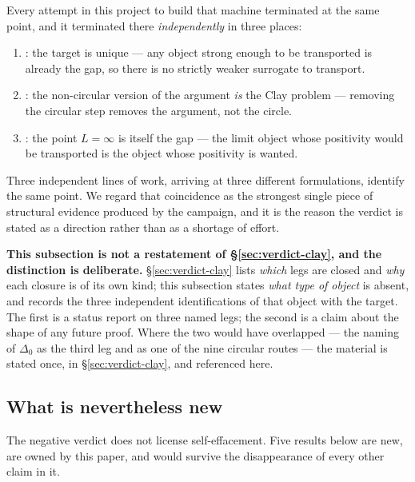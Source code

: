 Every attempt in this project to build that machine terminated at the same point, and it terminated
there \emph{independently} in three places:

\begin{enumerate}
\item {}: the target is unique --- any object strong enough to be transported is already
the gap, so there is no strictly weaker surrogate to transport.
\item {}: the non-circular version of the argument \emph{is} the Clay problem --- removing
the circular step removes the argument, not the circle.
\item {}: the point $L = \infty$ is itself the gap --- the limit object whose positivity
would be transported is the object whose positivity is wanted.
\end{enumerate}

\noindent Three independent lines of work, arriving at three different formulations, identify the
same point. We regard that coincidence as the strongest single piece of structural evidence
produced by the campaign, and it is the reason the verdict is stated as a direction rather than as
a shortage of effort.

\begin{qbox}
\textbf{This subsection is not a restatement of \S\ref{sec:verdict-clay}, and the distinction is
deliberate.} \S\ref{sec:verdict-clay} lists \emph{which} legs are closed and \emph{why} each closure
is of its own kind; this subsection states \emph{what type of object} is absent, and records the
three independent identifications of that object with the target. The first is a status report on
three named legs; the second is a claim about the shape of any future proof. Where the two would
have overlapped --- the naming of $\Delta_0$ as the third leg and as one of the nine circular routes
--- the material is stated once, in \S\ref{sec:verdict-clay}, and referenced here.
\end{qbox}

\subsection{What is nevertheless new}
\label{sec:verdict-new}

The negative verdict does not license self-effacement. Five results below are new, are owned by
this paper, and would survive the disappearance of every other claim in it.

